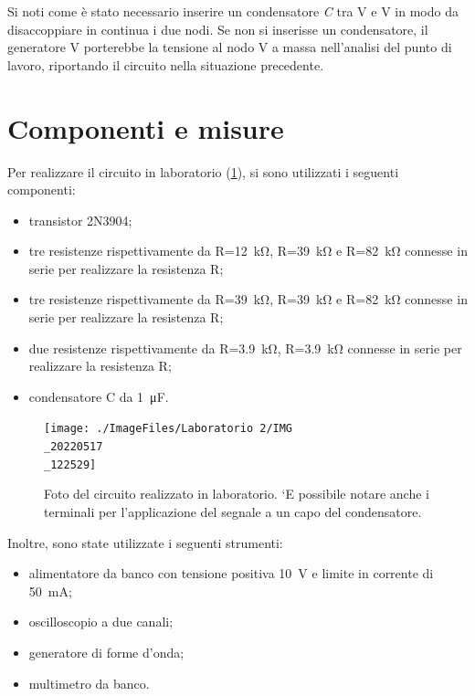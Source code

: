 Si noti come è stato necessario inserire un condensatore \textit{C} tra V e V in modo da disaccoppiare in continua i due nodi. Se non si inserisse un condensatore, il generatore V porterebbe la tensione al nodo V a massa nell'analisi del punto di lavoro, riportando il circuito nella situazione precedente.

\section{Componenti e misure}
Per realizzare il circuito in laboratorio (\Fig\ref{fig:emitterfollwer_v2_circuito}), si sono utilizzati i seguenti componenti:
\begin{itemize}
	\item transistor 2N3904;
	\item tre resistenze rispettivamente da R=\SI{12}{\kilo\ohm}, R=\SI{39}{\kilo\ohm} e R=\SI{82}{\kilo\ohm} connesse in serie per realizzare la resistenza R;
	\item tre resistenze rispettivamente da R=\SI{39}{\kilo\ohm}, R=\SI{39}{\kilo\ohm} e R=\SI{82}{\kilo\ohm} connesse in serie per realizzare la resistenza R;
	\item due resistenze rispettivamente da R=\SI{3.9}{\kilo\ohm}, R=\SI{3.9}{\kilo\ohm} connesse in serie per realizzare la resistenza R;
	\item condensatore C da \SI{1}{\micro\farad}.
\end{itemize}

\begin{figure}[h!]
	\centering
	\texttt{[image: ./ImageFiles/Laboratorio 2/IMG\\\_20220517\\\_122529]}
	\caption{Foto del circuito realizzato in laboratorio. `E possibile notare anche i terminali per l'applicazione del segnale a un capo del condensatore.}
	\label{fig:emitterfollwer_v2_circuito}
\end{figure}

Inoltre, sono state utilizzate i seguenti strumenti:
\begin{itemize}
	\item alimentatore da banco con tensione positiva \SI{10}{\volt} e limite in corrente di \SI{50}{\milli\ampere};
	\item oscilloscopio a due canali;
	\item generatore di forme d'onda;
	\item multimetro da banco.
\end{itemize}

